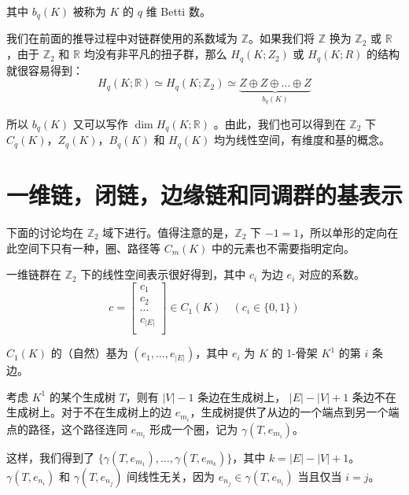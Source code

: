 其中 $ b_q(K) $ 被称为 $ K $ 的 $ q $ 维 Betti 数。

我们在前面的推导过程中对链群使用的系数域为 $ \mathbb Z $。如果我们将 $ \mathbb{Z} $ 换为 $ \mathbb{Z}_2 $ 或 $ \mathbb{R} $，由于 $ \mathbb{Z}_2 $ 和 $ \mathbb{R} $ 均没有非平凡的扭子群，那么 $ H_q(K; Z_2) $ 或 $ H_q(K; R) $ 的结构就很容易得到：
$$
H_q(K;\mathbb{R}) \simeq H_q(K;\mathbb{Z}_2) \simeq\underbrace{Z \oplus Z \oplus \dots \oplus Z}_{b_q(K)}
$$

所以 $ b_q(K) $ 又可以写作 $ \dim H_q(K; \mathbb{R}) $ 。由此，我们也可以得到在 $ \mathbb{Z}_2 $ 下 $ C_q(K) $，$ Z_q(K) $，$ B_q(K) $ 和 $ H_q(K) $ 均为线性空间，有维度和基的概念。


\section{一维链，闭链，边缘链和同调群的基表示}

下面的讨论均在 $ \mathbb{Z}_2 $ 域下进行。值得注意的是，$ \mathbb{Z}_2 $ 下 $ -1 = 1 $，所以单形的定向在此空间下只有一种，圈、路径等 $ C_m(K) $ 中的元素也不需要指明定向。

一维链群在 $ \mathbb{Z}_2 $ 下的线性空间表示很好得到，其中 $ c_i $ 为边 $ e_i $ 对应的系数。
$$
c = \begin{bmatrix}
        c_1 \\
        c_2 \\
        \cdots \\
        c_{|E|} \\
    \end{bmatrix} \in C_1(K) \quad (c_i \in \{0, 1\})
$$

$ C_1(K) $ 的（自然）基为 $ (e_1, \dots, e_{|E|}) $，其中 $ e_i $ 为 $ K $ 的 1-骨架 $ K^1 $ 的第 $ i $ 条边。

考虑 $ K^1 $ 的某个生成树 $ T $，则有 $ |V| - 1 $ 条边在生成树上， $ |E| - |V| + 1 $ 条边不在生成树上。对于不在生成树上的边 $ e_{m_i} $，生成树提供了从边的一个端点到另一个端点的路径，这个路径连同 $ e_{m_i} $ 形成一个圈，记为 $ \gamma(T, e_{m_i}) $。

这样，我们得到了 $ \{ \gamma(T, e_{m_1}), \dots, \gamma(T, e_{m_{k}}) \} $，其中 $ k = |E| - |V| + 1 $。$ \gamma(T, e_{n_i}) $ 和 $ \gamma(T, e_{n_j}) $ 间线性无关，因为 $ e_{n_j} \in \gamma(T, e_{n_i}) $ 当且仅当 $ i = j $。

